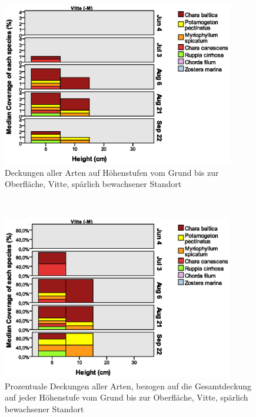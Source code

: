 \begin{figure}[!htb]
\centering
\includegraphics[width=0.90\textwidth]{images/Wuchshoehenkartierung/Vitte-M1.eps}
\caption[Höhenstufenkartierung Vitte (-M)]{Deckungen aller Arten auf Höhenstufen vom Grund bis zur Oberfläche, Vitte, spärlich bewachsener Standort}
\label{fig:wuchshoehen_vitte_-m1}
\end{figure}
\\
\begin{figure}[!htb]
\centering
\includegraphics[width=0.90\textwidth]{images/Wuchshoehenkartierung/Vitte-M2.eps}
\caption[prozentuale Höhenstufenkartierung Vitte, vegetationsarmer Standort]{Prozentuale Deckungen aller Arten, bezogen auf die Gesamtdeckung auf jeder Höhenstufe vom Grund bis zur Oberfläche, Vitte, spärlich bewachsener Standort}
\label{fig:wuchshoehen_vitte_-m2}
\end{figure}
\\
\FloatBarrier


